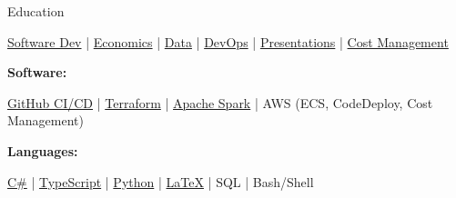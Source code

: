 \documentclass{content/resume/resume}
\begin{document}
\begin{rSection}{Education}
\begin{adjustwidth}{6em}{0pt}
  \href{https://chaoticgood.computer/?search=Software}{Software Dev} |
  \href{https://chaoticgood.computer/?search=Economics}{Economics} |
  \href{https://chaoticgood.computer/?search=Data}{Data} | 
  \href{https://chaoticgood.computer/?search=DevOps}{DevOps} |
  \href{https://chaoticgood.computer/?search=Presentation}{Presentations} |
  \href{https://chaoticgood.computer/?search=Cost}{Cost Management}
\end{adjustwidth}


%
%
%
\vspace{-3pt}
{\bf Software:}
\vspace{-1.83em}
\begin{adjustwidth}{6em}{0pt}
  \href{https://chaoticgood.computer/?search=GitHub}{GitHub CI/CD} | 
  \href{https://chaoticgood.computer/?search=Terraform}{Terraform} |
  \href{https://chaoticgood.computer/?search=Spark}{Apache Spark} | 
  AWS (ECS, CodeDeploy, Cost Management)

\end{adjustwidth}


%
%   
%
%
%
\vspace{-0.4em}
{\bf Languages:}
\vspace{-1.83em}
\begin{adjustwidth}{6em}{0pt}
  \href{https://chaoticgood.computer/?search=C%23}{C\#} |
  \href{https://chaoticgood.computer/?search=TypeScript}{TypeScript} | 
  \href{https://chaoticgood.computer/?search=Python}{Python} |
  \href{https://chaoticgood.computer/?search=LaTeX}{LaTeX} |
  SQL |
  Bash/Shell
\end{adjustwidth}

\end{rSection}
\end{document}
